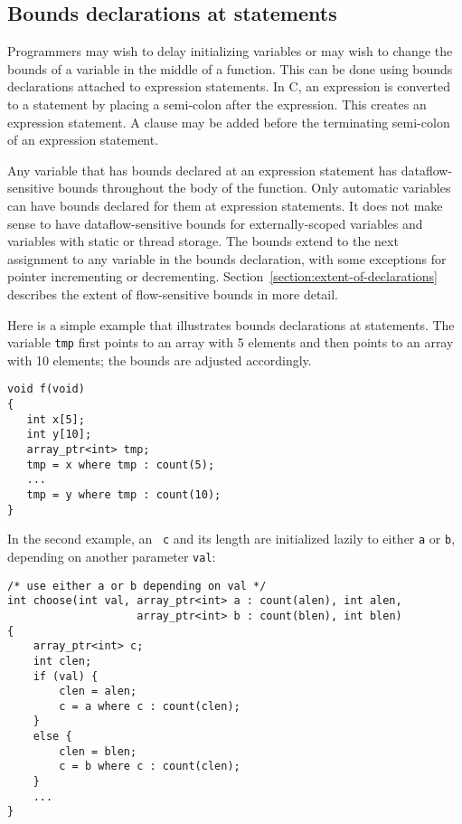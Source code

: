 \subsection{Bounds declarations at statements}
\label{section:statement-declarations}

Programmers may wish to delay initializing variables or may wish to
change the bounds of a variable in the middle of a function. This can be
done using bounds declarations attached to expression statements. In C,
an expression is converted to a statement by placing a semi-colon after
the expression. This creates an expression statement. A 
clause may be added before the terminating semi-colon of an expression
statement.

Any variable that has bounds declared at an expression statement has
dataflow-sensitive bounds throughout the body of the function. Only
automatic variables can have bounds declared for them at expression
statements. It does not make sense to have dataflow-sensitive bounds for
externally-scoped variables and variables with static or thread storage.
The bounds extend to the next assignment to any variable in the bounds
declaration, with some exceptions for pointer incrementing or
decrementing. Section~\ref{section:extent-of-declarations} 
describes the extent of flow-sensitive bounds
in more detail.

Here is a simple example that illustrates bounds declarations at
statements. The variable \texttt{tmp} first points to an array with 5
elements and then points to an array with 10 elements; the bounds are
adjusted accordingly.

\begin{lstlisting}
void f(void) 
{
   int x[5];
   int y[10];
   array_ptr<int> tmp;
   tmp = x where tmp : count(5);
   ...
   tmp = y where tmp : count(10);
}
\end{lstlisting}

In the second example, an \arrayptr\ \texttt{c} and its length are initialized
lazily to either \texttt{a} or \texttt{b}, depending on another parameter \texttt{val}:

\begin{lstlisting}
/* use either a or b depending on val */
int choose(int val, array_ptr<int> a : count(alen), int alen,
                    array_ptr<int> b : count(blen), int blen) 
{
    array_ptr<int> c;
    int clen;
    if (val) {
        clen = alen;
        c = a where c : count(clen);
    }
    else {
        clen = blen;
        c = b where c : count(clen);
    }    
    ...
}
\end{lstlisting}


